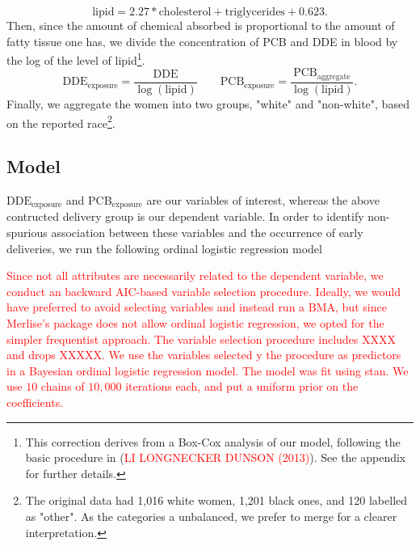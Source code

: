 \documentclass[wcp]{jmlr}%
\newcommand\todo[1]{\textcolor{red}{#1}}
\begin{document}
\begin{equation}
\label{eq:fat}
\text{lipid} = 2.27 * \text{cholesterol} + \text{triglycerides} + 0.623.
\end{equation}
Then, since the amount of chemical absorbed is proportional to the amount of fatty tissue one has, we divide the concentration of PCB and DDE in blood by the log of the level of lipid\footnote{This correction derives from a Box-Cox analysis of our model, following the basic procedure in (\textcolor{red}{LI LONGNECKER DUNSON (2013)}). See the appendix for further details.}.
\begin{equation}
\label{eq:exp_dde_pcb}
\text{DDE}_{\text{exposure}} = \dfrac{\text{DDE}}{\log(\text{lipid})} \qquad \text{PCB}_{\text{exposure}} = \dfrac{\text{PCB}_\text{aggregate}}{\log(\text{lipid})}.
\end{equation}
Finally, we aggregate the women into two groups, "white" and "non-white", based on the reported race\footnote{The original data had 1,016 white women, 1,201 black ones, and 120 labelled as "other". As the categories a unbalanced, we prefer to merge for a clearer interpretation.}.

\subsection{Model}
$\text{DDE}_{\text{exposure}}$ and $\text{PCB}_{\text{exposure}}$ are our variables of interest, whereas the above contructed delivery group is our dependent variable. In order to identify non-spurious association between these variables and the occurrence of early deliveries, we run the following ordinal logistic regression model 

\begin{equation}
\label{eq:ordi_logit}
\end{equation}
\todo{
Since not all attributes are necessarily related to the dependent variable, we conduct an backward AIC-based variable selection procedure. Ideally, we would have preferred to avoid selecting variables and instead run a BMA, but since Merlise's package does not allow ordinal logistic regression, we opted for the simpler frequentist approach. The variable selection procedure includes XXXX and drops XXXXX. We use the variables selected y the procedure as predictors in a Bayesian ordinal logistic regression model. The model was fit using stan. We use $10$ chains of $10,000$ iterations each, and put a uniform prior on the coefficients.}

\end{document}
